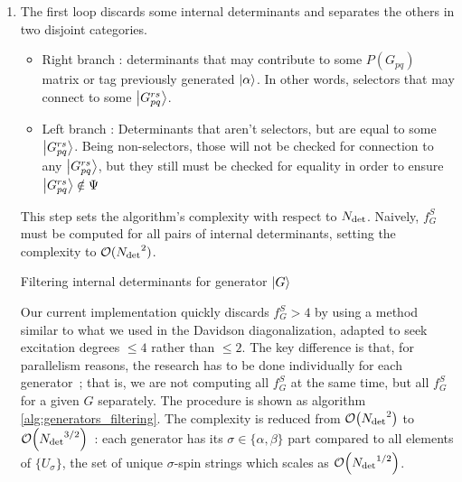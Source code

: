 \documentclass[./thesis.tex]{subfiles}
\begin{document}
\begin{enumerate}

\item
The first loop discards some internal determinants and separates the others in two disjoint categories.


\begin{itemize}
\item
Right branch : determinants that may contribute to some $P(G_{pq})$ matrix or tag previously generated $\ket \alpha$. In other words, selectors that may connect to some $\ket {G_{pq}^{rs}}$. 

\item
Left branch : Determinants that aren't selectors, but are equal to some $\ket {G_{pq}^{rs}}$. Being non-selectors, those will not be checked for connection to any $\ket {G_{pq}^{rs}}$, but they still must be checked for equality in order to ensure $\ket {G_{pq}^{rs}} \notin \Psi$
\end{itemize}


This step sets the algorithm's complexity with respect to ${N_\text{det}}$. Naively, $f_G^S$ must be computed for all pairs of internal determinants, setting the complexity to $\mathcal{O}({N_\text{det}}^2)$.
\begin{algorithm}
\caption{Filtering internal determinants for generator $\ket G$}
\label{alg:generators_filtering}
\end{algorithm}
Our current implementation quickly discards $f_G^S > 4$ by using a method similar to what we used in the Davidson diagonalization, adapted to seek excitation degrees $\leq 4$ rather than $\leq 2$. The key difference is that, for parallelism reasons, the research has to be done individually for each generator~; that is, we are not computing all $f_G^S$ at the same time, but all $f_G^S$ for a given $G$ separately. The procedure is shown as algorithm \ref{alg:generators_filtering}. The complexity is reduced from $\order{\Ndet^2}$ to $\order{\Ndet^{3/2}}$~: each generator has its $\sigma \in \{\alpha, \beta\}$ part compared to all elements of $\{U_\sigma\}$,
the set of unique $\sigma$-spin strings which scales as $\order{\Ndet^{1/2}}$.





\end{enumerate}
\end{document}
